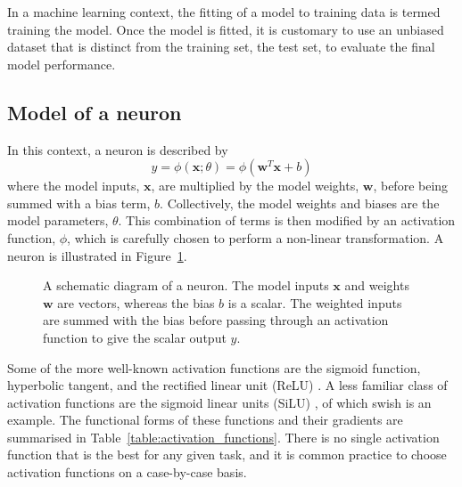 \documentclass[main.tex]{subfiles}
\begin{document}
    In a machine learning context, the fitting of a
    model to training data is termed training the model.
    Once the model is fitted, it is customary to use
    an unbiased dataset that is distinct from the training set, the test set,
    to evaluate the final model performance.

\subsection{Model of a neuron}
    In this context, a neuron is described by
    \begin{equation}\label{eqn:neuron}
        y = \phi(\mathbf{x}; \theta) = \phi(\mathbf{w}^{T}\mathbf{x} + b)
    \end{equation}
    where the model inputs, $\mathbf{x}$, are multiplied
    by the model weights, $\mathbf{w}$, before being summed
    with a bias term, $b$. Collectively, the model weights
    and biases are the model parameters, $\theta$.
    This combination of terms is then modified
    by an activation function, $\phi$, which is carefully
    chosen to perform a non-linear transformation. A neuron
    is illustrated in Figure~\ref{fig:neuron}.
    
    \begin{figure}
        \caption{A schematic diagram of a neuron. The model inputs
        $\mathbf{x}$ and weights $\mathbf{w}$ are vectors, whereas
        the bias $b$ is a scalar. The weighted inputs are summed with
        the bias before passing through an activation function
        to give the scalar output $y$.}
        \label{fig:neuron}
    \end{figure}
    
    Some of the more well-known activation functions are
    the sigmoid function, hyperbolic tangent, and the rectified linear unit (ReLU) \cite{Nair2010RectifiedLU}.
    A less familiar class of activation functions are the
    sigmoid linear units (SiLU) \cite{Hendrycks2016BridgingNA},
    of which swish \cite{DBLP:journals/corr/abs-1710-05941} is an example.
    The functional forms of these
    functions and their gradients are summarised in Table~\ref{table:activation_functions}.
    There is no single activation function that is the best
    for any given task, and it is common practice to choose activation
    functions on a case-by-case basis.
\end{document}
